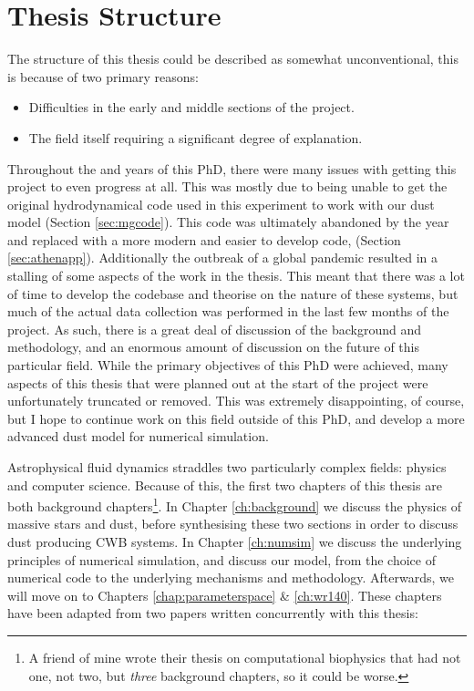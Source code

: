 \section{Thesis Structure}

The structure of this thesis could be described as somewhat unconventional, this is because of two primary reasons:

\begin{itemize}
  \item Difficulties in the early and middle sections of the project.
  \item The field itself requiring a significant degree of explanation.
\end{itemize}

\noindent
Throughout the  and  years of this PhD, there were many issues with getting this project to even progress at all.
This was mostly due to being unable to get the original hydrodynamical code used in this experiment to work with our dust model (Section \ref{sec:mgcode}).
This code was ultimately abandoned by the  year and replaced with a more modern and easier to develop code, \athena{} (Section \ref{sec:athenapp}).
Additionally the outbreak of a global pandemic resulted in a stalling of some aspects of the work in the thesis.
This meant that there was a lot of time to develop the codebase and theorise on the nature of these systems, but much of the actual data collection was performed in the last few months of the project.
As such, there is a great deal of discussion of the background and methodology, and an enormous amount of discussion on the future of this particular field.
While the primary objectives of this PhD were achieved, many aspects of this thesis that were planned out at the start of the project were unfortunately truncated or removed.
This was extremely disappointing, of course, but I hope to continue work on this field outside of this PhD, and develop a more advanced dust model for numerical simulation.

Astrophysical fluid dynamics straddles two particularly complex fields: physics and computer science.
Because of this, the first two chapters of this thesis are both background chapters\footnote{A friend of mine wrote their thesis on computational biophysics that had not one, not two, but \emph{three} background chapters, so it could be worse.}.
In Chapter \ref{ch:background} we discuss the physics of massive stars and dust, before synthesising these two sections in order to discuss dust producing CWB systems.
In Chapter \ref{ch:numsim} we discuss the underlying principles of numerical simulation, and discuss our model, from the choice of numerical code to the underlying mechanisms and methodology.
Afterwards, we will move on to Chapters \ref{chap:parameterspace} \& \ref{ch:wr140}.
These chapters have been adapted from two papers written concurrently with this thesis:

